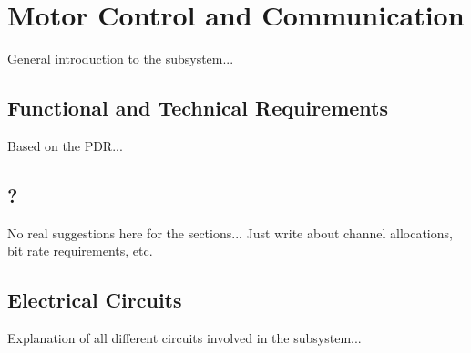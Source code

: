 \chapter{Motor Control and Communication}
\label{chap:mcc}

General introduction to the subsystem...

\section{Functional and Technical Requirements}

Based on the PDR...

\section{?}

No real suggestions here for the sections... Just write about channel allocations, bit rate requirements, etc.

\section{Electrical Circuits}

Explanation of all different circuits involved in the subsystem...